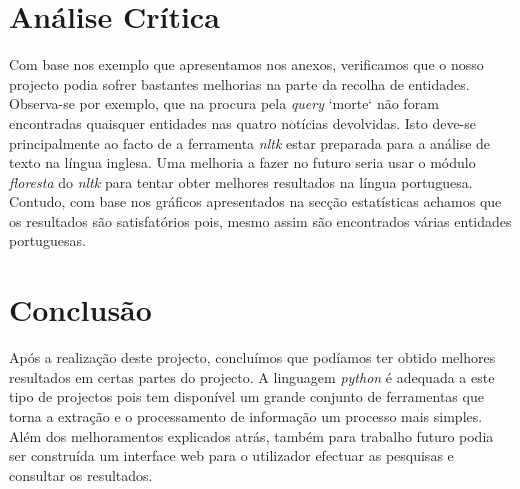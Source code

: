 \section{Análise Crítica}
Com base nos exemplo que apresentamos nos anexos, verificamos que o nosso projecto podia sofrer bastantes melhorias na parte da recolha de entidades. Observa-se por exemplo, que na procura pela \textit{query} `morte` não foram encontradas quaisquer entidades nas quatro notícias devolvidas. Isto deve-se principalmente ao facto de a ferramenta \textit{nltk} estar preparada para a análise de texto na língua inglesa. Uma melhoria a fazer no futuro seria usar o módulo \textit{floresta} do \textit{nltk} para tentar obter melhores resultados na língua portuguesa. Contudo, com base nos gráficos apresentados na secção estatísticas achamos que os resultados são satisfatórios pois, mesmo assim são encontrados várias entidades portuguesas.

\section{Conclusão}
Após a realização deste projecto, concluímos que podíamos ter obtido melhores resultados em certas partes do projecto. A linguagem \textit{python} é adequada a este tipo de projectos pois tem disponível um grande conjunto de ferramentas que torna a extração e o processamento de informação um processo mais simples. Além dos melhoramentos explicados atrás, também para trabalho futuro podia ser construída um interface web para o utilizador efectuar as pesquisas e consultar os resultados.